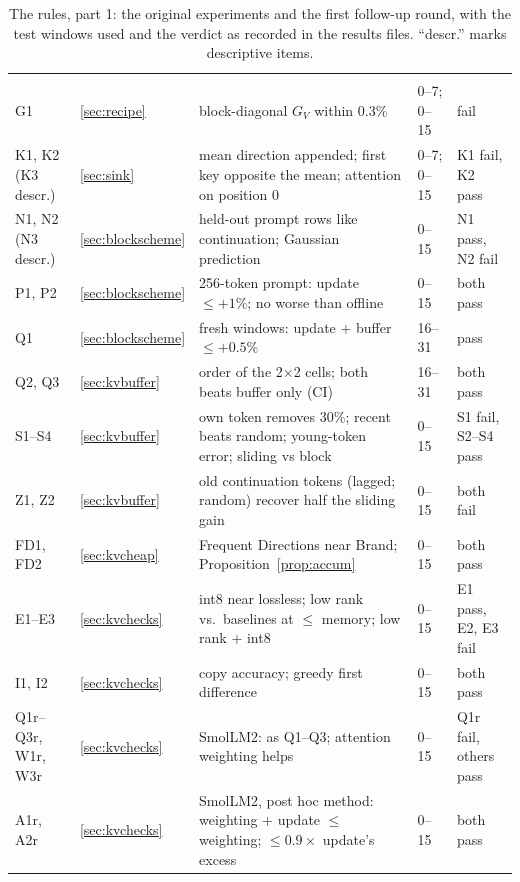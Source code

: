 \documentclass[10pt]{article}
\theoremstyle{plain}
\theoremstyle{definition}
\theoremstyle{remark}
\newcommand{\rl}[1]{\textsf{#1}}%
\begin{document}
\begin{table}[p]
\begin{tabularx}{\textwidth}{@{}>{\raggedright}p{2.4cm} >{\raggedright}p{0.7cm} >{\raggedright}X >{\raggedright}p{1.4cm} >{\raggedright\arraybackslash}p{4.0cm}@{}}
\multicolumn{5}{@{}l}{\emph{Follow-ups, first round (Section~\ref{sec:kvchecks})}}\\
\rl{G1} & \ref{sec:recipe} & block-diagonal $G_V$ within $0.3\%$ & 0--7; 0--15 & fail\\
\rl{K1}, \rl{K2} (\rl{K3} descr.) & \ref{sec:sink} & mean direction appended; first key opposite the mean; attention on position 0 & 0--7; 0--15 & \rl{K1} fail, \rl{K2} pass\\
\rl{N1}, \rl{N2} (\rl{N3} descr.) & \ref{sec:blockscheme} & held-out prompt rows like continuation; Gaussian prediction & 0--15 & \rl{N1} pass, \rl{N2} fail\\
\rl{P1}, \rl{P2} & \ref{sec:blockscheme} & 256-token prompt: update $\le+1\%$; no worse than offline & 0--15 & both pass\\
\rl{Q1} & \ref{sec:blockscheme} & fresh windows: update + buffer $\le+0.5\%$ & 16--31 & pass\\
\rl{Q2}, \rl{Q3} & \ref{sec:kvbuffer} & order of the 2$\times$2 cells; both beats buffer only (CI) & 16--31 & both pass\\
\rl{S1}--\rl{S4} & \ref{sec:kvbuffer} & own token removes $30\%$; recent beats random; young-token error; sliding vs block & 0--15 & \rl{S1} fail, \rl{S2}--\rl{S4} pass\\
\rl{Z1}, \rl{Z2} & \ref{sec:kvbuffer} & old continuation tokens (lagged; random) recover half the sliding gain & 0--15 & both fail\\
\rl{FD1}, \rl{FD2} & \ref{sec:kvcheap} & Frequent Directions near Brand; Proposition~\ref{prop:accum} & 0--15 & both pass\\
\rl{E1}--\rl{E3} & \ref{sec:kvchecks} & int8 near lossless; low rank vs.\ baselines at $\le$ memory; low rank + int8 & 0--15 & \rl{E1} pass, \rl{E2}, \rl{E3} fail\\
\rl{I1}, \rl{I2} & \ref{sec:kvchecks} & copy accuracy; greedy first difference & 0--15 & both pass\\
\rl{Q1r}--\rl{Q3r}, \rl{W1r}, \rl{W3r} & \ref{sec:kvchecks} & SmolLM2: as \rl{Q1}--\rl{Q3}; attention weighting helps & 0--15 & \rl{Q1r} fail, others pass\\
\rl{A1r}, \rl{A2r} & \ref{sec:kvchecks} & SmolLM2, post hoc method: weighting + update $\le$ weighting; $\le0.9\times$ update's excess & 0--15 & both pass\\
\bottomrule
\end{tabularx}
\caption{The rules, part 1: the original experiments and the first follow-up round, with the test windows used and the verdict as recorded in the results files. ``descr.'' marks descriptive items.}
\label{tab:rules}
\end{table}
\end{document}
